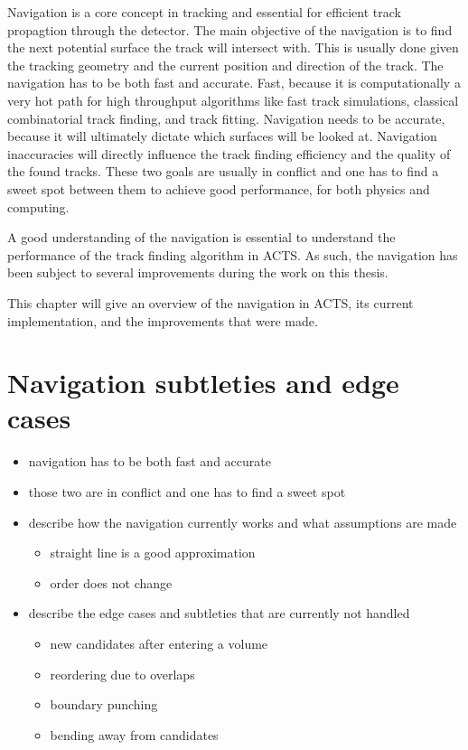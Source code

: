 Navigation is a core concept in tracking and essential for efficient track propagtion through the detector. The main objective of the navigation is to find the next potential surface the track will intersect with. This is usually done given the tracking geometry and the current position and direction of the track. The navigation has to be both fast and accurate. Fast, because it is computationally a very hot path for high throughput algorithms like fast track simulations, classical combinatorial track finding, and track fitting. Navigation needs to be accurate, because it will ultimately dictate which surfaces will be looked at. Navigation inaccuracies will directly influence the track finding efficiency and the quality of the found tracks. These two goals are usually in conflict and one has to find a sweet spot between them to achieve good performance, for both physics and computing.

A good understanding of the navigation is essential to understand the performance of the track finding algorithm in ACTS. As such, the navigation has been subject to several improvements during the work on this thesis.

This chapter will give an overview of the navigation in ACTS, its current implementation, and the improvements that were made.

\section{Navigation subtleties and edge cases}

\begin{itemize}
    \color{red}
    \item navigation has to be both fast and accurate
    \item those two are in conflict and one has to find a sweet spot
    \item describe how the navigation currently works and what assumptions are made
    \begin{itemize}
        \item straight line is a good approximation
        \item order does not change
    \end{itemize}
    \item describe the edge cases and subtleties that are currently not handled
    \begin{itemize}
        \item new candidates after entering a volume
        \item reordering due to overlaps
        \item boundary punching
        \item bending away from candidates
    \end{itemize}
\end{itemize}


